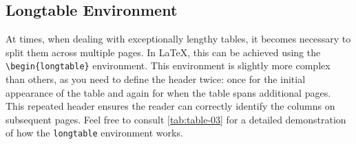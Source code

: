 \subsection{Longtable Environment}
At times, when dealing with exceptionally lengthy tables, it becomes necessary to split them across multiple pages. In \LaTeX, this can be achieved using the \verb|\begin{longtable}| environment. This environment is slightly more complex than others, as you need to define the header twice: once for the initial appearance of the table and again for when the table spans additional pages. This repeated header ensures the reader can correctly identify the columns on subsequent pages. Feel free to consult \autoref{tab:table-03} for a detailed demonstration of how the \verb|longtable| environment works.

